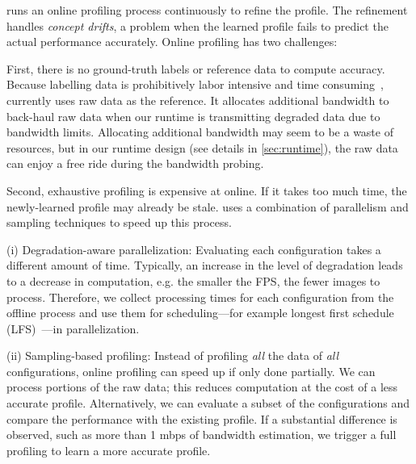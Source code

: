  \sysname{} runs an online profiling process
continuously to refine the profile. The refinement handles \textit{concept
  drifts}, a problem when the learned profile fails to predict the actual
performance accurately. Online profiling has two challenges:

First, there is no ground-truth labels or reference data to compute
accuracy. Because labelling data is prohibitively labor intensive and time
consuming~\cite{russell2008labelme}, \sysname{} currently uses raw data as the
reference. It allocates additional bandwidth to back-haul raw data when our
runtime is transmitting degraded data due to bandwidth limits. Allocating
additional bandwidth may seem to be a waste of resources, but in our runtime
design (see details in \autoref{sec:runtime}), the raw data can enjoy a free
ride during the bandwidth probing.

Second, exhaustive profiling is expensive at online. If it takes too much time,
the newly-learned profile may already be stale. \sysname{} uses a combination of
parallelism and sampling techniques to speed up this process.

(i) Degradation-aware parallelization: Evaluating each configuration takes a
different amount of time. Typically, an increase in the level of degradation
leads to a decrease in computation, e.g. the smaller the FPS, the fewer images
to process. Therefore, we collect processing times for each configuration from
the offline process and use them for scheduling---for example longest first
schedule (LFS)~\cite{karger2010scheduling}---in parallelization.

(ii) Sampling-based profiling: Instead of profiling \textit{all} the data of
\textit{all} configurations, online profiling can speed up if only done
partially. We can process portions of the raw data; this reduces computation at
the cost of a less accurate profile. Alternatively, we can evaluate a subset of
the configurations and compare the performance with the existing profile. If a
substantial difference is observed, such as more than 1 mbps of bandwidth
estimation, we trigger a full profiling to learn a more accurate profile.

